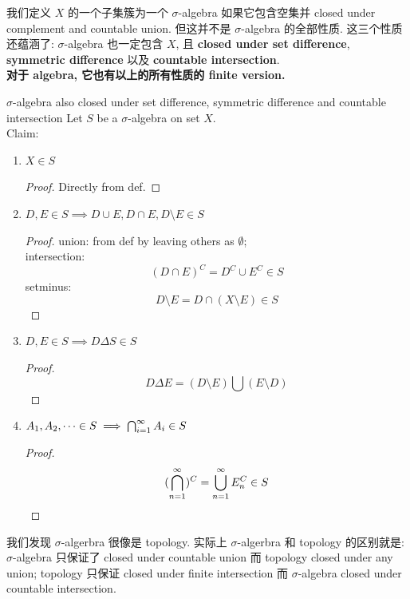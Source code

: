 \documentclass[lang=cn,11pt]{elegantbook}
\begin{document}
\noindent 我们定义 $X$ 的一个子集簇为一个 $\sigma$-algebra 如果它包含空集并 closed under complement and countable union. 但这并不是 $\sigma$-algebra 的全部性质. 这三个性质还蕴涵了: $\sigma$-algebra 也一定包含 $X$, 且 \textbf{closed under set difference}, \textbf{symmetric difference} 以及 \textbf{countable intersection}. \\
\noindent \textbf{对于 algebra, 它也有以上的所有性质的 finite version.}


\begin{theorem}{$\sigma$-algebra also closed under set difference, symmetric difference and countable intersection}
    Let $S$ be a $\sigma$-algebra on set $X$.\\
    Claim: 
    \begin{enumerate}
        \item $X \in S$
        \begin{proof}
            Directly from def.
        \end{proof}
        \item $D,E \in S \implies D\cup E, D\cap E, D \setminus E \in S$
        \begin{proof}
            union: from def by leaving others as $\emptyset$; \\intersection: $$(D\cap E)^C = D^C \cup E^C \in S$$
            setminus: $$ D\setminus E = D \cap (X \setminus E) \in S$$    
        \end{proof}
        \item $D,E \in S \implies D \Delta S\in S$
        \begin{proof}
        $$
        D \Delta E = (D \setminus E) \bigcup (E \setminus D)
        $$
        \end{proof}
        \item $A_1,A_2,\cdots \in S \implies \bigcap_{i=1}^\infty A_i \in S$
        \begin{proof}
            $$(\bigcap_{n=1}^\infty )^C = \bigcup_{n=1}^\infty E_n ^C \in S  $$
        \end{proof}
    \end{enumerate}
\end{theorem}

\begin{remark}
    我们发现 $\sigma$-algerbra 很像是 topology. 实际上 $\sigma$-algerbra 和 topology 的区别就是: $\sigma$-algebra 只保证了 closed under countable union 而 topology closed under any union; topology 只保证 closed under finite intersection 而 $\sigma$-algebra closed under countable intersection.
\end{remark}
\end{document}
